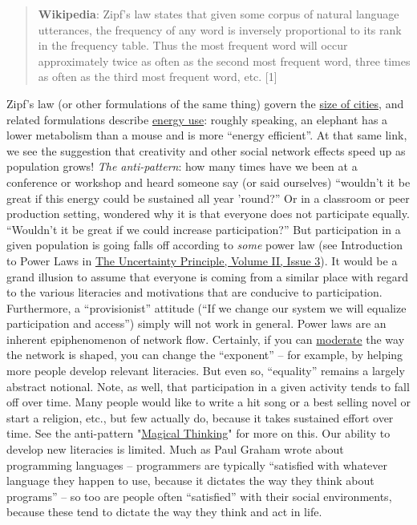 \begin{quote}
\textbf{Wikipedia}: Zipf's law states that given some corpus of natural
language utterances, the frequency of any word is inversely proportional
to its rank in the frequency table. Thus the most frequent word will
occur approximately twice as often as the second most frequent word,
three times as often as the third most frequent word, etc. {[}1{]}
\end{quote}
Zipf's law (or other formulations of the same thing) govern the
\href{http://www2.econ.uu.nl/users/marrewijk/geography/zipf/index.htm}{size
of cities}, and related formulations describe
\href{http://pricetags.wordpress.com/2010/10/26/kleibers-law-growth-and-creativity-in-cities/}{energy
use}: roughly speaking, an elephant has a lower metabolism than a mouse
and is more ``energy efficient''. At that same link, we see the
suggestion that creativity and other social network effects speed up as
population grows! \emph{The anti-pattern}: how many times have we been
at a conference or workshop and heard someone say (or said ourselves)
``wouldn't it be great if this energy could be sustained all year
'round?'' Or in a classroom or peer production setting, wondered why it
is that everyone does not participate equally. ``Wouldn't it be great if
we could increase participation?'' But participation in a given
population is going falls off according to \emph{some} power law (see
Introduction to Power Laws in
\href{http://www.theuncertaintyprinciple.danoff.org/v2i3.html}{The
Uncertainty Principle, Volume II, Issue 3}). It would be a grand
illusion to assume that everyone is coming from a similar place with
regard to the various literacies and motivations that are conducive to
participation. Furthermore, a ``provisionist'' attitude (``If we change
our system we will equalize participation and access'') simply will not
work in general. Power laws are an inherent epiphenomenon of network
flow. Certainly, if you can
\href{http://peeragogy.org/practice/moderation/}{moderate} the way the
network is shaped, you can change the ``exponent'' -- for example, by
helping more people develop relevant literacies. But even so,
``equality'' remains a largely abstract notional. Note, as well, that
participation in a given activity tends to fall off over time. Many
people would like to write a hit song or a best selling novel or start a
religion, etc., but few actually do, because it takes sustained effort
over time. See the anti-pattern
"\href{http://peeragogy.org/antipatterns/magical-thinking/}{Magical
Thinking}" for more on this. Our ability to develop new literacies is
limited. Much as Paul Graham wrote about programming languages --
programmers are typically ``satisfied with whatever language they happen
to use, because it dictates the way they think about programs'' -- so
too are people often ``satisfied'' with their social environments,
because these tend to dictate the way they think and act in life.

